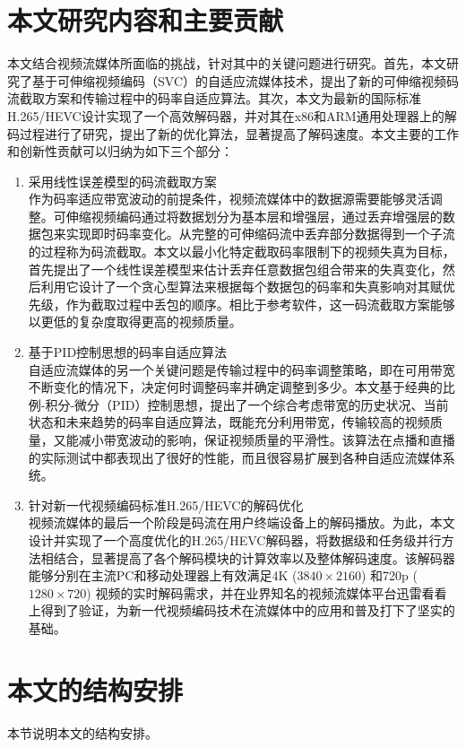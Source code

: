 \section{本文研究内容和主要贡献}

本文结合视频流媒体所面临的挑战，针对其中的关键问题进行研究。首先，本文研究了基于可伸缩视频编码（SVC）的自适应流媒体技术，提出了新的可伸缩视频码流截取方案和传输过程中的码率自适应算法。其次，本文为最新的国际标准H.265/HEVC设计实现了一个高效解码器，并对其在x86和ARM通用处理器上的解码过程进行了研究，提出了新的优化算法，显著提高了解码速度。本文主要的工作和创新性贡献可以归纳为如下三个部分：

\begin{enumerate}
	\item {采用线性误差模型的码流截取方案}\\
	作为码率适应带宽波动的前提条件，视频流媒体中的数据源需要能够灵活调整。可伸缩视频编码通过将数据划分为基本层和增强层，通过丢弃增强层的数据包来实现即时码率变化。从完整的可伸缩码流中丢弃部分数据得到一个子流的过程称为码流截取。本文以最小化特定截取码率限制下的视频失真为目标，首先提出了一个线性误差模型来估计丢弃任意数据包组合带来的失真变化，然后利用它设计了一个贪心型算法来根据每个数据包的码率和失真影响对其赋优先级，作为截取过程中丢包的顺序。相比于参考软件，这一码流截取方案能够以更低的复杂度取得更高的视频质量。
	\item {基于PID控制思想的码率自适应算法}\\
	自适应流媒体的另一个关键问题是传输过程中的码率调整策略，即在可用带宽不断变化的情况下，决定何时调整码率并确定调整到多少。本文基于经典的比例-积分-微分（PID）控制思想，提出了一个综合考虑带宽的历史状况、当前状态和未来趋势的码率自适应算法，既能充分利用带宽，传输较高的视频质量，又能减小带宽波动的影响，保证视频质量的平滑性。该算法在点播和直播的实际测试中都表现出了很好的性能，而且很容易扩展到各种自适应流媒体系统。
	\item {针对新一代视频编码标准H.265/HEVC的解码优化}\\
	视频流媒体的最后一个阶段是码流在用户终端设备上的解码播放。为此，本文设计并实现了一个高度优化的H.265/HEVC解码器，将数据级和任务级并行方法相结合，显著提高了各个解码模块的计算效率以及整体解码速度。该解码器能够分别在主流PC和移动处理器上有效满足4K ($3840 \times 2160$) 和720p ($1280 \times 720$) 视频的实时解码需求，并在业界知名的视频流媒体平台迅雷看看上得到了验证，为新一代视频编码技术在流媒体中的应用和普及打下了坚实的基础。 
\end{enumerate}

\section{本文的结构安排}
本节说明本文的结构安排。